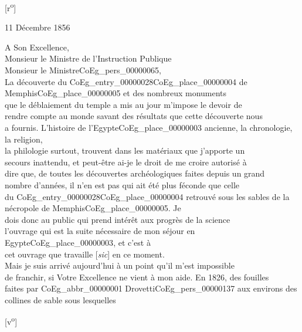 \documentclass{book}
\begin{document}
{\footnotesize\begin{center} {[r\textsuperscript{o}]}\end{center}}
\begin{flushright}11 Décembre 1856\end{flushright}
\indent A Son Excellence,\\
\indent Monsieur le Ministre de l’Instruction Publique\\

\hspace{1cm} Monsieur le Ministre\gls{CoEg_pers_00000065},\\

\indent La découverte du \Gls{CoEg_entry_00000028}\gls{CoEg_place_00000004} de Memphis\gls{CoEg_place_00000005} et des nombreux monuments\\
que le déblaiement du temple a mis au jour m’impose le devoir de\\
rendre compte au monde savant des résultats que cette découverte nous\\
a fournis. L’histoire de l’Egypte\gls{CoEg_place_00000003} ancienne, la chronologie, la religion,\\
la philologie surtout, trouvent dans les matériaux que j’apporte un\\
secours inattendu, et peut-être ai-je le droit de me croire autorisé à\\
dire que, de toutes les découvertes archéologiques faites depuis un grand\\
nombre d’années, il n’en est pas qui ait été plus féconde que celle\\
du \Gls{CoEg_entry_00000028}\gls{CoEg_place_00000004} retrouvé sous les sables de la nécropole de Memphis\gls{CoEg_place_00000005}. Je\\
dois donc au public qui prend intérêt aux progrès de la science\\
l’ouvrage qui est la suite nécessaire de mon séjour en Egypte\gls{CoEg_place_00000003}, et c’est à\\
cet ouvrage que travaille [\textit{sic}] en ce moment.\\
\indent Mais je suis arrivé aujourd’hui à un point qu’il m’est impossible\\
de franchir, si Votre Excellence ne vient à mon aide. En 1826, des fouilles\\
faites par \gls{CoEg_abbr_00000001} Drovetti\gls{CoEg_pers_00000137} aux environs des collines de sable sous lesquelles
{\footnotesize\begin{center} {[v\textsuperscript{o}]}\end{center}}
\end{document}
